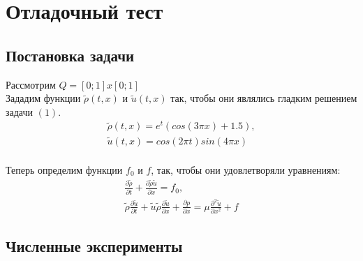\section{Отладочный тест}
\subsection{Постановка задачи}

Рассмотрим $Q = [0;1] x [0;1]$\\

Зададим функции $\tilde{\rho}(t, x)$ и $\tilde{u}(t, x)$ так, чтобы они являлись гладким решением задачи $(1)$.
\begin{equation}
	\begin{array}{lc}
		\tilde{\rho}(t, x) = e^t(cos(3\pi x) + 1.5),\\
		\tilde{u}(t, x) = cos(2\pi t)sin(4\pi x)\\
	\end{array}
\end{equation}

Теперь определим функции $f_0$ и $f$, так, чтобы они удовлетворяли уравнениям:
\begin{equation}
	\begin{array}{lc}
		\frac{\partial\tilde{\rho}}{\partial t} + \frac{\partial\tilde{\rho}\tilde{u}}{\partial x} = f_0,\\
		\tilde{\rho}\frac{\partial\tilde{u}}{\partial t} + \tilde{u}\tilde{\rho}\frac{\partial\tilde{u}}{\partial x} + \frac{\partial p}{\partial x} = \mu\frac{\partial^2\tilde{u}}{\partial x^2} + f
	\end{array}
\end{equation}

\subsection{Численные эксперименты}


\newpage














